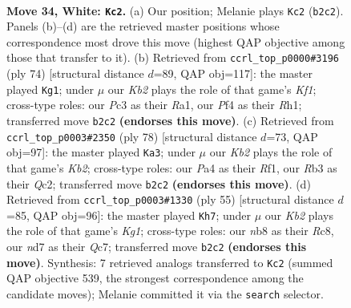 \documentclass[11pt]{article}
\begin{document}
\clearpage

\begin{figure}[p]\centering
\begin{subfigure}{0.46\textwidth}\centering
\resizebox{\linewidth}{!}{%
\newchessgame
\chessboard[
  setfen={1n3rk1/2pnq2p/rp2p1p1/p3Pp2/P2P1P1P/1RP3N1/1K4PQ/4NR2 w - - 9 34},
  showmover=false,
  pgfstyle=straightmove, color=movearrow, markmove={b2-c2}
]}
\caption{}
\end{subfigure}\hfill
\begin{subfigure}{0.46\textwidth}\centering
\resizebox{\linewidth}{!}{%
\newchessgame
\chessboard[
  setfen={1r2r3/6k1/3nqpn1/1p1p2p1/2pP3p/P1N1PN1P/1Q3PP1/R4K1R w - - 14 38},
  showmover=false,
  pgfstyle=straightmove, color=movearrow, markmove={f1-g1}
]}
\caption{}
\end{subfigure}
\\[4pt]
\begin{subfigure}{0.46\textwidth}\centering
\resizebox{\linewidth}{!}{%
\newchessgame
\chessboard[
  setfen={3qrnk1/5rp1/3p2n1/pNpPppP1/P1P4p/1P3P1N/1KQ4P/4RR2 w - - 14 40},
  showmover=false,
  pgfstyle=straightmove, color=movearrow, markmove={b2-a3}
]}
\caption{}
\end{subfigure}\hfill
\begin{subfigure}{0.46\textwidth}\centering
\resizebox{\linewidth}{!}{%
\newchessgame
\chessboard[
  setfen={2r3k1/2qr1pp1/pp1ppnnp/8/2P1P3/1PNRQN1P/P4PP1/3R2K1 b - - 1 28},
  showmover=false,
  pgfstyle=straightmove, color=movearrow, markmove={g8-h7}
]}
\caption{}
\end{subfigure}
\caption{\textbf{Move 34, White: \texttt{Kc2}.} (a) Our position; Melanie plays \texttt{Kc2} (\texttt{b2c2}). Panels (b)--(d) are the retrieved master positions whose correspondence most drove this move (highest QAP objective among those that transfer to it). (b) Retrieved from \texttt{ccrl\_top\_p0000\#3196} (ply 74) [structural distance $d$=89, QAP obj=117]: the master played \texttt{Kg1}; under $\mu$ our \emph{Kb2} plays the role of that game's \emph{Kf1}; cross-type roles: our \emph{P}c3 as their \emph{R}a1, our \emph{P}f4 as their \emph{R}h1; transferred move \texttt{b2c2} \textbf{(endorses this move)}. (c) Retrieved from \texttt{ccrl\_top\_p0003\#2350} (ply 78) [structural distance $d$=73, QAP obj=97]: the master played \texttt{Ka3}; under $\mu$ our \emph{Kb2} plays the role of that game's \emph{Kb2}; cross-type roles: our \emph{P}a4 as their \emph{R}f1, our \emph{R}b3 as their \emph{Q}c2; transferred move \texttt{b2c2} \textbf{(endorses this move)}. (d) Retrieved from \texttt{ccrl\_top\_p0003\#1330} (ply 55) [structural distance $d$=85, QAP obj=96]: the master played \texttt{Kh7}; under $\mu$ our \emph{Kb2} plays the role of that game's \emph{Kg1}; cross-type roles: our \emph{n}b8 as their \emph{R}c8, our \emph{n}d7 as their \emph{Q}c7; transferred move \texttt{b2c2} \textbf{(endorses this move)}. Synthesis: 7 retrieved analogs transferred to \texttt{Kc2} (summed QAP objective 539, the strongest correspondence among the candidate moves); Melanie committed it via the \texttt{search} selector.}
\label{fig:thought-m66}
\end{figure}
\end{document}
